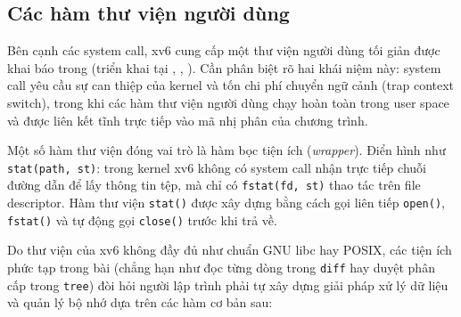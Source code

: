\documentclass[12pt,a4paper]{article}
\begin{document}
\subsection{Các hàm thư viện người dùng}

Bên cạnh các system call, xv6 cung cấp một thư viện người dùng tối giản được khai báo trong  (triển khai tại , , ). Cần phân biệt rõ hai khái niệm này: system call yêu cầu sự can thiệp của kernel và tốn chi phí chuyển ngữ cảnh (trap context switch), trong khi các hàm thư viện người dùng chạy hoàn toàn trong user space và được liên kết tĩnh trực tiếp vào mã nhị phân của chương trình.

Một số hàm thư viện đóng vai trò là hàm bọc tiện ích (\textit{wrapper}). Điển hình như \texttt{stat(path, st)}: trong kernel xv6 không có system call nhận trực tiếp chuỗi đường dẫn để lấy thông tin tệp, mà chỉ có \texttt{fstat(fd, st)} thao tác trên file descriptor. Hàm thư viện \texttt{stat()} được xây dựng bằng cách gọi liên tiếp \texttt{open()}, \texttt{fstat()} và tự động gọi \texttt{close()} trước khi trả về.

Do thư viện của xv6 không đầy đủ như chuẩn GNU libc hay POSIX, các tiện ích phức tạp trong bài (chẳng hạn như đọc từng dòng trong \texttt{diff} hay duyệt phân cấp trong \texttt{tree}) đòi hỏi người lập trình phải tự xây dựng giải pháp xử lý dữ liệu và quản lý bộ nhớ dựa trên các hàm cơ bản sau:

\newpage
\end{document}

